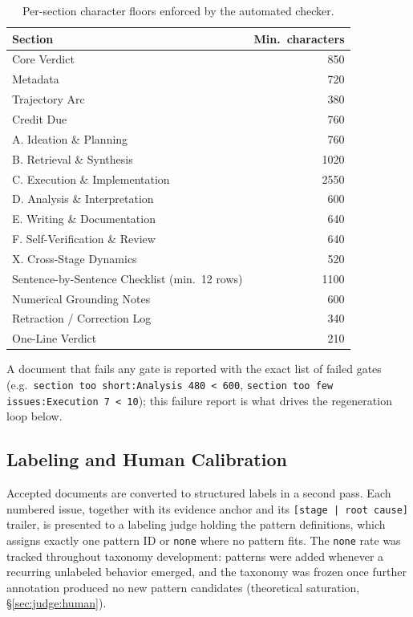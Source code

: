\begin{table}[h]
\centering
\small
\caption{Per-section character floors enforced by the automated checker.}
\label{tab:sectionfloors}
\begin{tabular}{lr}
\toprule
Section & Min.\ characters \\
\midrule
Core Verdict & 850 \\
Metadata & 720 \\
Trajectory Arc & 380 \\
Credit Due & 760 \\
A. Ideation \& Planning & 760 \\
B. Retrieval \& Synthesis & 1020 \\
C. Execution \& Implementation & 2550 \\
D. Analysis \& Interpretation & 600 \\
E. Writing \& Documentation & 640 \\
F. Self-Verification \& Review & 640 \\
X. Cross-Stage Dynamics & 520 \\
Sentence-by-Sentence Checklist (min.\ 12 rows) & 1100 \\
Numerical Grounding Notes & 600 \\
Retraction / Correction Log & 340 \\
One-Line Verdict & 210 \\
\bottomrule
\end{tabular}

\end{table}

A document that fails any gate is reported with the exact list of failed
gates (e.g.\ \texttt{section too short:Analysis 480 < 600},
\texttt{section too few issues:Execution 7 < 10}); this failure report is
what drives the regeneration loop below.

\subsection{\taxonomy Labeling and Human Calibration}
\label{app:evaluator:labeling}

Accepted documents are converted to structured labels in a second pass.
Each numbered issue, together with its evidence anchor and its
\texttt{[stage | root cause]} trailer, is presented to a labeling judge
holding the \taxonomy pattern definitions, which assigns exactly one pattern ID
or \texttt{none} where no pattern fits. The \texttt{none} rate was tracked throughout taxonomy development:
patterns were added whenever a recurring unlabeled behavior emerged, and the
taxonomy was frozen once further annotation produced no new pattern candidates
(theoretical saturation, \S\ref{sec:judge:human}).

